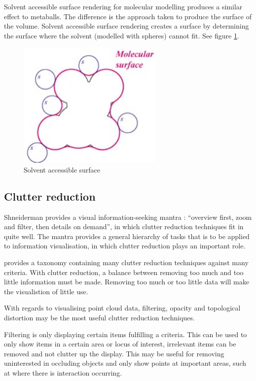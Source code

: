 Solvent accessible surface rendering for molecular modelling produces a similar
effect to metaballs. The difference is the approach taken to produce the
surface of the volume. Solvent accessible surface rendering creates a surface
by determining the surface where the solvent (modelled with spheres) cannot
fit. See figure \ref{fig:sas}.

\begin{figure}[h!]
  \begin{center}
    \includegraphics[width=70mm]{sas_ms}
  \end{center}
  \caption{Solvent accessible surface}
  \label{fig:sas}
\end{figure}


\subsection{Clutter reduction}
\label{sub:clutter_reduction}

Shneiderman provides a visual information-seeking mantra \citep{shneiderman96}:
``overview first, zoom and filter, then details on demand'', in which clutter
reduction techniques fit in quite well. The mantra provides a general hierarchy
of tasks that is to be applied to information visualisation, in which clutter
reduction plays an important role.

\citet{ellis07} provides a taxonomy containing many clutter reduction techniques
against many criteria. With clutter reduction, a balance between removing too
much and too little information must be made. Removing too much or too little
data will make the visualistion of little use.

With regards to visualising point cloud data, filtering, opacity and topological
distortion may be the most useful clutter reduction techniques.

Filtering is only displaying certain items fulfilling a criteria. This can be
used to only show items in a certain area or locus of interest, irrelevant items
can be removed and not clutter up the display. This may be useful for removing
uninterested in occluding objects and only show points at important areas, such
at where there is interaction occurring.

